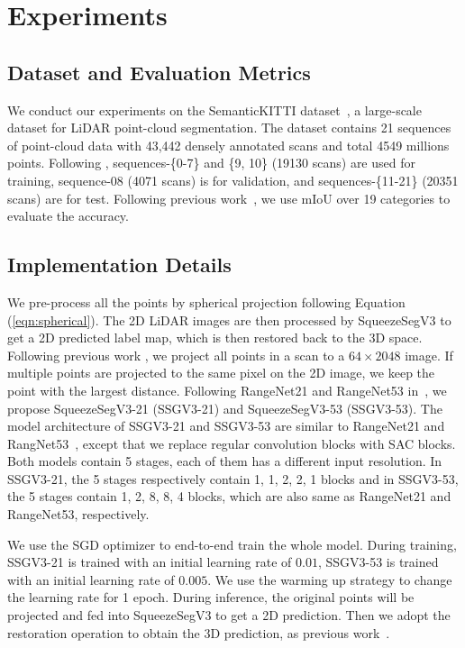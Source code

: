 \documentclass[runningheads]{llncs}
\begin{document}
\section{Experiments}
\subsection{Dataset and Evaluation Metrics}
We conduct our experiments on the SemanticKITTI dataset~\cite{behley2019iccv}, a large-scale dataset for LiDAR point-cloud segmentation. The dataset contains 21 sequences of point-cloud data with 43,442 densely annotated scans and total 4549 millions points. Following \cite{behley2019iccv}, sequences-\{0-7\} and \{9, 10\} (19130 scans) are used for training, sequence-08 (4071 scans) is for validation, and sequences-\{11-21\} (20351 scans) are for test. Following previous work~\cite{milioto2019rangenet++}, we use mIoU over 19 categories to evaluate the accuracy.



\subsection{Implementation Details}
We pre-process all the points by spherical projection following Equation (\ref{eqn:spherical}). The 2D LiDAR images are then processed by SqueezeSegV3 to get a 2D predicted label map, which is then restored back to the 3D space. 
Following previous work \cite{milioto2019rangenet++,wu2017squeezeseg,wu2018squeezesegv2}, we project all points in a scan to a $64 \times 2048$ image. If multiple points are projected to the same pixel on the 2D image, we keep the point with the largest distance. Following RangeNet21 and RangeNet53 in~\cite{milioto2019rangenet++}, we propose SqueezeSegV3-21 (SSGV3-21) and SqueezeSegV3-53 (SSGV3-53). The model architecture of SSGV3-21 and SSGV3-53 are similar to RangeNet21 and RangNet53~\cite{milioto2019rangenet++}, except that we replace regular convolution blocks with SAC blocks. Both models contain 5 stages, each of them has a different input resolution. In SSGV3-21, the 5 stages respectively contain 1, 1, 2, 2, 1 blocks and in SSGV3-53, the 5 stages contain 1, 2, 8, 8, 4 blocks, which are also same as  RangeNet21 and RangeNet53, respectively. 

We use the SGD optimizer to end-to-end train the whole model. During training, SSGV3-21 is trained with an initial learning rate of $0.01$, SSGV3-53 is trained with an initial learning rate of $0.005$. We use the warming up strategy to change the learning rate for 1 epoch. During inference, the original points will be projected and fed into SqueezeSegV3 to get a 2D prediction. Then we adopt the restoration operation to obtain the 3D prediction, as previous work~\cite{milioto2019rangenet++,wu2017squeezeseg,wu2018squeezesegv2}. 
\end{document}
